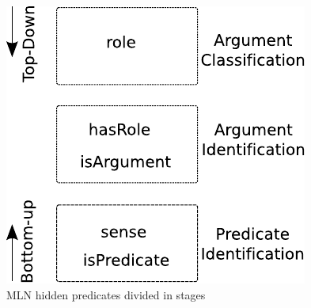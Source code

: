 \begin{figure}
\begin{center}
    \includegraphics[scale=.80]{TaskArchitecture}
\end{center}
\caption{MLN hidden predicates divided in stages}
\label{fig:achitecture}
\end{figure}

